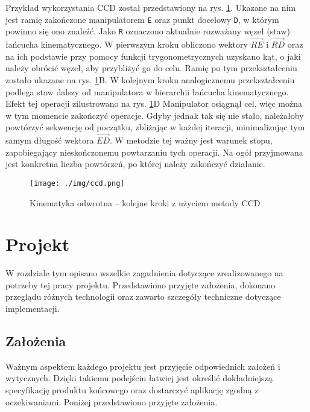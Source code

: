 \documentclass[11pt]{mwrep}
\begin{document}
  Przykład wykorzystania CCD został przedstawiony na rys. \ref{img:ccd}. Ukazane na nim jest ramię zakończone manipulatorem \texttt{E} oraz punkt docelowy \texttt{D}, w którym powinno się ono znaleźć. Jako \texttt{R} oznaczono aktualnie rozważany węzeł (staw) łańcucha kinematycznego. W pierwszym kroku obliczono wektory $\vec{RE}$ i $\vec{RD}$ oraz na ich podstawie przy pomocy funkcji trygonometrycznych uzyskano kąt, o jaki należy obrócić węzeł, aby przybliżyć go do celu. Ramię po tym przekształceniu zostało ukazane na rys. \ref{img:ccd}B. W kolejnym kroku analogicznemu przekształceniu podlega staw dalszy od manipulatora w hierarchii łańcucha kinematycznego. Efekt tej operacji zilustrowano na rys. \ref{img:ccd}D Manipulator osiągnął cel, więc można w tym momencie zakończyć operacje. Gdyby jednak tak się nie stało, należałoby powtórzyć sekwencję od początku, zbliżając w każdej iteracji, minimalizując tym samym długość wektora $\vec{ED}$. W metodzie tej ważny jest warunek stopu, zapobiegający nieskończonemu powtarzaniu tych operacji. Na ogół przyjmowana jest konkretna liczba powtórzeń, po której należy zakończyć działanie.

  \begin{figure}
  \centering
    \texttt{[image: ./img/ccd.png]}
  \caption{Kinematyka odwrotna -- kolejne kroki z użyciem metody CCD \cite{lander}}
  \label{img:ccd}
  \end{figure}


\chapter{Projekt}

W rozdziale tym opisano wszelkie zagadnienia dotyczące zrealizowanego na potrzeby tej pracy projektu. Przedstawiono przyjęte założenia, dokonano przeglądu różnych technologii oraz zawarto szczegóły techniczne dotyczące implementacji.


  \section{Założenia}

Ważnym aspektem każdego projektu jest przyjęcie odpowiednich założeń i wytycznych. Dzięki takiemu podejściu łatwiej jest określić dokładniejszą specyfikację produktu końcowego oraz dostarczyć aplikację zgodną z oczekiwaniami. Poniżej przedstawiono przyjęte założenia.
\end{document}
